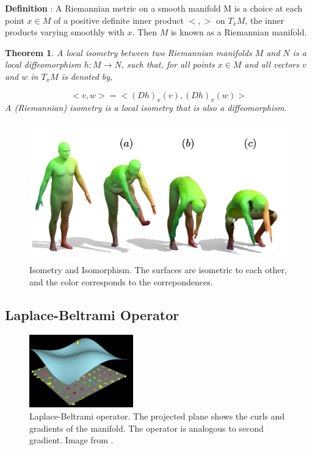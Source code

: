 \documentclass[a4paper,10pt]{article}
\newtheorem{theorem}{Theorem}
\begin{document}
\textbf{Definition} : A Riemannian metric on a smooth manifold M is a choice at each point $ x \in M $ of a positive definite inner product $ <, > $ on $ T_{x}M $, the inner products varying smoothly with $ x $. Then $ M $ is known as a Riemannian manifold.

\begin{theorem}

A local isometry between two Riemannian manifolds $ M $ and $ N $ is a local diffeomorphism $ h: M \xrightarrow{} N $, such that, for all points $ x \in M $ and all vectors $ v $ and $ w $ in $ T_{x}M $ is denoted by,

\begin{equation}
 <v, w> =  <(Dh)_{x}(v), (Dh)_{x}(w)>
\end{equation}
A (Riemannian) isometry is a local isometry that is also a diffeomorphism.
\end{theorem}

\begin{figure}[hbt!]
    \centering
    \includegraphics[height=0.4\textwidth]{isometry.png}
    \caption{Isometry and Isomorphism. The surfaces are isometric to each other, and the color corresponds to the correpondences.}
    \label{fig:isometry}
\end{figure}


\subsection{Laplace-Beltrami Operator}

\begin{figure}
    \centering
    \includegraphics[width=0.4\textwidth]{laplacian.png}
    \caption{Laplace-Beltrami operator. The projected plane shows the curls and gradients of the manifold. The operator is analogous to second gradient. Image from \cite{eisenberger2019smooth}.}
    \label{fig:laplacian}
\end{figure}
\end{document}
